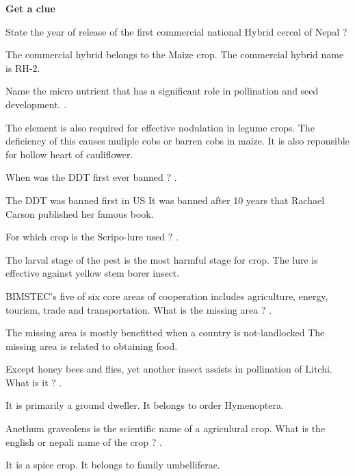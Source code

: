 \documentclass[10pt,a4paper,answers]{exam}
\begin{document}
\begin{center}
{\textbf {\LARGE Get a clue}}
\end{center}

\begin{questions}
  \question State the year of release of the first commercial national Hybrid cereal of Nepal ? \fillin[2069 BS or 2012 AD][3cm]
  \begin{solution}
  The commercial hybrid belongs to the Maize crop.
  The commercial hybrid name is RH-2.
  \end{solution}

\question Name the micro nutrient that has a significant role in pollination and seed development. \fillin[Boron][3cm].
  \begin{solution}
  The element is also required for effective nodulation in legume crops.
  The deficiency of this causes muliple cobs or barren cobs in maize.
  It is also reponsible for hollow heart of cauliflower.
  \end{solution}
  
\question When was the DDT first ever banned ? \fillin[1972][3cm].
  \begin{solution}
  The DDT was banned first in US
  It was banned after 10 years that Rachael Carson published her famous book.
  \end{solution}

\question For which crop is the Scripo-lure used ? \fillin[Rice][3cm].
  \begin{solution}
  The larval stage of the pest is the most harmful stage for crop.
  The lure is effective against yellow stem borer insect.
  \end{solution}

\question BIMSTEC's five of six core areas of cooperation includes agriculture, energy, tourism, trade and transportation. What is the missing area ? \fillin[Fishery][3cm].
  \begin{solution}
  The missing area is mostly benefitted when a country is not-landlocked
  The missing area is related to obtaining food.
  \end{solution}

\question Except honey bees and flies, yet another insect assists in pollination of Litchi. What is it ? \fillin[Ant][3cm].
  \begin{solution}
  It is primarily a ground dweller.
  It belongs to order Hymenoptera.
  \end{solution}

\question Anethum graveolens is the scientific name of a agriculural crop. What is the english or nepali name of the crop ? \fillin[Dill][3cm].
  \begin{solution}
  It is a spice crop.
  It belongs to family umbelliferae.
  \end{solution}


\end{questions}
\end{document}
